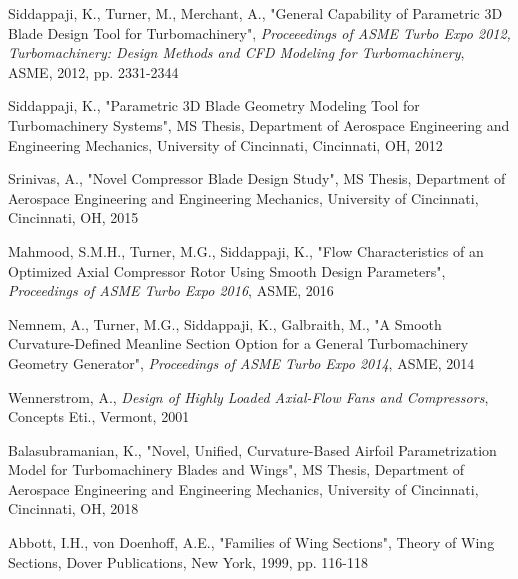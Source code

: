 \documentclass[8pt]{article}
\begin{document}
\begin{thebibliography}{1}
    
    Siddappaji, K., Turner, M., Merchant, A., "General Capability of Parametric 3D Blade Design Tool for Turbomachinery", 
    \textit{Proceeedings of ASME Turbo Expo 2012, Turbomachinery: Design Methods and CFD Modeling for Turbomachinery}, ASME,
    2012, pp. 2331-2344

    Siddappaji, K., "Parametric 3D Blade Geometry Modeling Tool for Turbomachinery Systems", MS Thesis,
    Department of Aerospace Engineering and Engineering Mechanics, University of Cincinnati, Cincinnati, OH, 2012

    Srinivas, A., "Novel Compressor Blade Design Study", MS Thesis, Department of Aerospace Engineering and Engineering 
    Mechanics, University of Cincinnati, Cincinnati, OH, 2015

    Mahmood, S.M.H., Turner, M.G., Siddappaji, K., "Flow Characteristics of an Optimized Axial Compressor Rotor Using Smooth
    Design Parameters", \textit{Proceedings of ASME Turbo Expo 2016}, ASME, 2016

    Nemnem, A., Turner, M.G., Siddappaji, K., Galbraith, M., 
    "A Smooth Curvature-Defined Meanline Section Option for a General Turbomachinery Geometry Generator", 
    \textit{Proceedings of ASME Turbo Expo 2014}, ASME, 2014

    Wennerstrom, A., \textit{Design of Highly Loaded Axial-Flow Fans and Compressors}, Concepts Eti., Vermont, 2001

    Balasubramanian, K., "Novel, Unified, Curvature-Based Airfoil Parametrization Model for Turbomachinery Blades and Wings",
    MS Thesis, Department of Aerospace Engineering and Engineering Mechanics, University of Cincinnati, Cincinnati, OH, 2018

    Abbott, I.H., von Doenhoff, A.E., "Families of Wing Sections", Theory of Wing Sections, Dover Publications, New York, 
    1999, pp. 116-118

\end{thebibliography}
\end{document}
